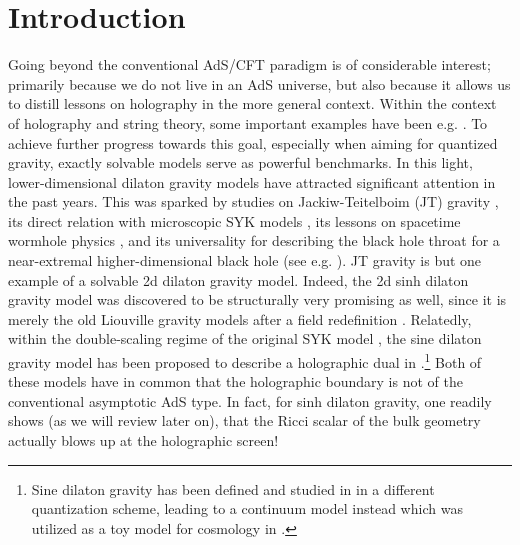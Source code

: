 \documentclass[a4paper,titlepage,12pt]{article}
\numberwithin{equation}{section}
\begin{document}
\tableofcontents


\setcounter{footnote}{0}

\section{Introduction}

Going beyond the conventional AdS/CFT paradigm \cite{Maldacena:1997re} is of considerable interest; primarily because we do not live in an AdS universe, but also because it allows us to distill lessons on holography in the more general context. Within the context of holography and string theory, some important examples have been e.g. \cite{Giveon:1999px,Klebanov:2000hb,Kanitscheider:2008kd,Taylor:2015glc}. To achieve further progress towards this goal, especially when aiming for quantized gravity, exactly solvable models serve as powerful benchmarks. In this light, lower-dimensional dilaton gravity models have attracted significant attention in the past years. This was sparked by studies on Jackiw-Teitelboim (JT) gravity \cite{Jackiw:1984je, Teitelboim:1983ux,Almheiri:2014cka, Jensen:2016pah, Maldacena:2016upp, Engelsoy:2016xyb, Cotler:2016fpe, Stanford:2017thb, Kitaev:2018wpr, Mertens:2017mtv, Mertens:2018fds, Lam:2018pvp, Harlow:2018tqv}, its direct relation with microscopic SYK models \cite{KitaevTalks, Sachdev:1992fk}, its lessons on spacetime wormhole physics \cite{Saad:2019lba}, and its universality for describing the black hole throat for a near-extremal higher-dimensional black hole (see e.g. \cite{Nayak:2018qej,Iliesiu:2020qvm}). JT gravity is but one example of a solvable 2d dilaton gravity model. Indeed, the 2d sinh dilaton gravity model was discovered to be structurally very promising as well, since it is merely the old Liouville gravity models after a field redefinition \cite{Kyono:2017pxs,Mertens:2020hbs,Mertens:2020pfe,Fan:2021bwt,Suzuki:2021zbe,Collier:2023cyw}. Relatedly, within the double-scaling regime of the original SYK model \cite{Berkooz:2018qkz,Berkooz:2018jqr,Lin:2022rbf,Susskind:2022bia,Bhattacharjee:2022ave,Blommaert:2023opb,Blommaert:2023wad,Susskind:2023hnj,Mukhametzhanov:2023tcg,Berkooz:2023cqc,Okuyama:2023bch,Lin:2022nss,Berkooz:2022mfk,Goel:2023svz,Narovlansky:2023lfz,Verlinde:2024zrh,Berkooz:2024evs,Lin:2023trc,Verlinde:2024znh,Almheiri:2024ayc,Almheiri:2024xtw,Bossi:2024ffa,Xu:2024hoc,Xu:2024gfm,Heller:2024ldz,Aguilar-Gutierrez:2024nau,Tietto:2025oxn,Aguilar-Gutierrez:2025hty,Berkooz:2025ydg}, the sine dilaton gravity model has been proposed to describe a holographic dual in \cite{Blommaert:2024ymv,Blommaert:2024whf,Blommaert:2025avl}.\footnote{Sine dilaton gravity has been defined and studied in \cite{Collier:2024kmo} in a different quantization scheme, leading to a continuum model instead which was utilized as a toy model for cosmology in \cite{Collier:2025lux}.} Both of these models have in common that the holographic boundary is not of the conventional asymptotic AdS type. In fact, for sinh dilaton gravity, one readily shows (as we will review later on), that the Ricci scalar of the bulk geometry actually blows up at the holographic screen!
\end{document}
